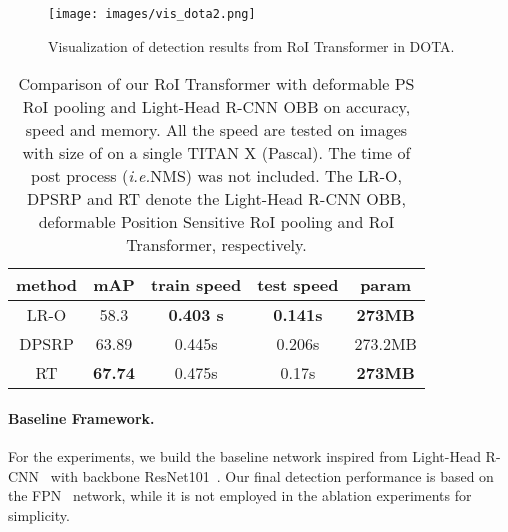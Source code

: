 \documentclass[11pt,onecolumn]{article}         \usepackage[top=3.6cm, bottom=3.2cm, left=2.3cm, right=2.3cm]{geometry}
\newcommand{\ie}{\emph{i.e.}}
\begin{document}
\begin{figure*}[t!]
    \centering
    \texttt{[image: images/vis\_dota2.png]}
\caption{
    Visualization of detection results from RoI Transformer in DOTA.
    }
\label{fig:vis_dota}
\end{figure*}

\begin{table}[t!]
\centering
\caption{Comparison of our RoI Transformer with deformable PS RoI pooling and Light-Head R-CNN OBB on accuracy, speed and memory. All the speed are tested on images with size of  on a single TITAN X (Pascal). The time of post process (\ie NMS) was not included. The LR-O, DPSRP and RT denote the Light-Head R-CNN OBB, deformable Position Sensitive RoI pooling and RoI Transformer, respectively.}
\vspace{3mm}
\begin{tabular}{c|cccc}
\hline
method & mAP   & train speed & test speed & param   \\ \hline
LR-O   & 58.3  & \textbf{0.403 s}      & \textbf{0.141s}      &\textbf{ 273MB}   \\
DPSRP  & 63.89 & 0.445s       & 0.206s      & 273.2MB \\
RT     & \textbf{67.74} & 0.475s       & 0.17s       & \textbf{273MB}   \\ \hline
\end{tabular}
\vspace{-3mm}
\label{compare_with_deform}
\end{table}


\paragraph{Baseline Framework.} \label{baseline_frame}
For the experiments, we build the baseline network inspired from Light-Head R-CNN~\cite{light_head} with backbone ResNet101~\cite{resnet}. Our final detection performance is based on the FPN~\cite{FPN} network, while it is not employed in the ablation experiments for simplicity.
\end{document}

